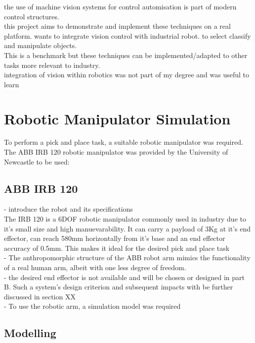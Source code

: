 \documentclass{UoNMCHA}
\numberwithin{equation}{section}
\begin{document}
the use of machine vision systems for control automisation is part of modern control structures. \\
this project aims to demonstrate and implement these techniques on a real platform. wants to integrate vision control with industrial robot. to select classify and manipulate objects.\\
This is a benchmark but these techniques can be implemented/adapted to other tasks more relevant to industry.\\   
integration of vision within robotics was not part of my degree and was useful to learn  


\newpage
\section{Robotic Manipulator Simulation}\label{sec:Core Section}


To perform a pick and place task, a suitable robotic manipulator was required. The ABB IRB 120 robotic manipulator was provided by the University of Newcastle to be used:
\subsection{ABB IRB 120}
- introduce the robot and its specifications\\
The IRB 120 is a 6DOF robotic manipulator commonly used in industry due to it's small size and high manuevarability. It can carry a payload of 3Kg at it's end effector, can reach 580mm horizontally from it's base and an end effector accuracy of 0.5mm. This makes it ideal for the desired pick and place task\\
- The anthropomorphic structure of the ABB robot arm mimics the functionality of a real human arm, albeit with one less degree of freedom.\\
- the desired end effector is not available and will be chosen or designed in part B. Such a system's design criterion and subsequent impacts with be further discussed in section XX\\
- To use the robotic arm, a simulation model was required 

\subsection{Modelling}
\end{document}
